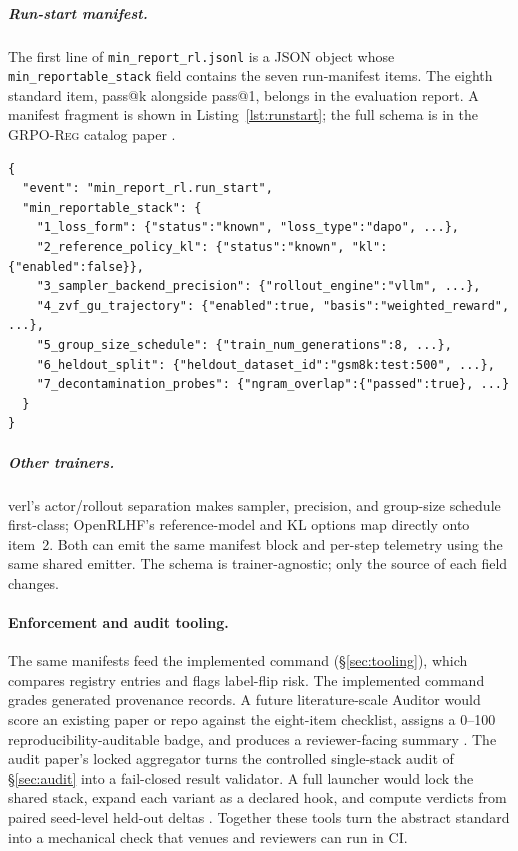 \documentclass[11pt]{article}
\newcommand{\grpoReg}{\textsc{GRPO-Reg}}
\begin{document}
\subparagraph{Run-start manifest.}
The first line of \texttt{min\_report\_rl.jsonl} is a JSON object whose
\texttt{min\_reportable\_stack} field contains the seven run-manifest items.
The eighth standard item, pass@k alongside pass@1, belongs in the evaluation
report. A manifest fragment is
shown in Listing~\ref{lst:runstart}; the full schema is in the
\grpoReg{} catalog paper \cite{grpoRegistry2026}.

\begin{lstlisting}[caption={Fragment of the
  \texttt{min\_report\_rl} run-start manifest.}, label={lst:runstart}]
{
  "event": "min_report_rl.run_start",
  "min_reportable_stack": {
    "1_loss_form": {"status":"known", "loss_type":"dapo", ...},
    "2_reference_policy_kl": {"status":"known", "kl": {"enabled":false}},
    "3_sampler_backend_precision": {"rollout_engine":"vllm", ...},
    "4_zvf_gu_trajectory": {"enabled":true, "basis":"weighted_reward", ...},
    "5_group_size_schedule": {"train_num_generations":8, ...},
    "6_heldout_split": {"heldout_dataset_id":"gsm8k:test:500", ...},
    "7_decontamination_probes": {"ngram_overlap":{"passed":true}, ...}
  }
}
\end{lstlisting}

\subparagraph{Other trainers.}
verl's actor/rollout separation makes sampler, precision, and group-size
schedule first-class; OpenRLHF's reference-model and KL options map directly
onto item~2. Both can emit the same manifest block and per-step telemetry using
the same shared emitter. The schema is trainer-agnostic; only the source of each
field changes.

\paragraph{Enforcement and audit tooling.}
The same manifests feed the implemented
 command
(\S\ref{sec:tooling}), which compares registry entries and flags label-flip
risk. The implemented  command
grades generated provenance records. A future literature-scale Auditor would
score an existing paper or repo against the eight-item checklist,
assigns a 0--100 reproducibility-auditable badge, and produces a reviewer-facing
summary \cite{zvfaudit2026}. The audit paper's locked aggregator turns the
controlled single-stack audit of \S\ref{sec:audit} into a fail-closed result
validator. A full launcher would lock the shared stack, expand each variant as
a declared hook, and compute verdicts from paired seed-level held-out deltas
\cite{zvfaudit2026}. Together these tools turn the abstract standard into a
mechanical check that venues and reviewers can run in CI.
\end{document}

